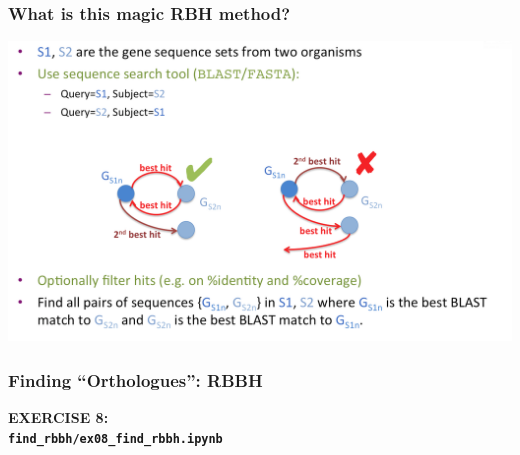 
\begin{frame}
  \frametitle{What is this magic RBH method?}
  \begin{center}
      \includegraphics[width=1\textwidth]{images/rbbh}      
  \end{center}
\end{frame}

%
\begin{frame}
  \frametitle{Finding ``Orthologues'': RBBH}
  \Large{
    \textcolor{hutton_blue}{
      \textbf{
      EXERCISE 8: \\
      \texttt{find\_rbbh/ex08\_find\_rbbh.ipynb}
      }
    }
  }
\end{frame}